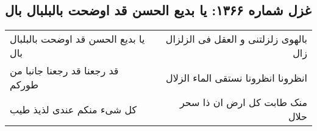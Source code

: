 \begin{center}
\section*{غزل شماره ۱۳۶۶: یا بدیع الحسن قد اوضحت بالبلبال بال}
\label{sec:1366}
\begin{longtable}{l p{0.5cm} r}
یا بدیع الحسن قد اوضحت بالبلبال بال
&&
بالهوی زلزلتنی و العقل فی الزلزال زال
\\
قد رجعنا قد رجعنا جانبا من طورکم
&&
انظرونا انظرونا نستقی الماء الزلال
\\
کل شیء منکم عندی لذیذ طیب
&&
منک طابت کل ارض ان ذا سحر حلال
\\
\end{longtable}
\end{center}
